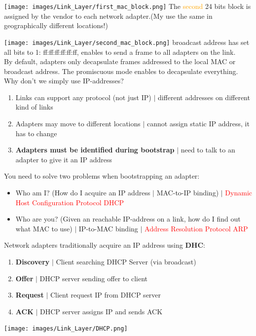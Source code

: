 \documentclass[a4paper, fontsize=8pt, landscape, DIV=1]{scrartcl}
\begin{document}
\begin{multicols*}{4}
		\texttt{[image: images/Link\_Layer/first\_mac\_block.png]}
		The \textcolor{Orange}{second} 24 bits block is assigned by the vendor to
		each network adapter.(My use the same in geographically different locations!)
		
		\texttt{[image: images/Link\_Layer/second\_mac\_block.png]}
		broadcast address has set all bits to 1: ff:ff:ff:ff:ff:ff, enables to
		send a frame to all adapters on the link.\\
		By default, adapters only decapsulate frames addressed to the local MAC or
		broadcast address. The promiscuous mode enables to decapsulate everything.\\
		Why don't we simply use IP-addresses?
		\begin{enumerate}[noitemsep]
			\item Links can support any protocol (not just IP) $\vert$ different
			addresses on different kind of links
			\item Adapters may move to different locations $\vert$ cannot assign
			static IP address, it has to change
			\item \textbf{Adapters must be identified during bootstrap} $\vert$ need
			to talk to an adapter to give it an IP address 
		\end{enumerate} 
		You need to solve two problems when bootstrapping an adapter:
		\begin{itemize}[noitemsep]
			\item Who am I? (How do I acquire an IP address $\vert$ MAC-to-IP
			binding) $\vert$ \textcolor{Red}{Dynamic Host Configuration Protocol DHCP}
			\item Who are you? (Given an reachable IP-address on a link, how do I
			find out what MAC to use) $\vert$ IP-to-MAC binding $\vert$
			\textcolor{Red}{Address Resolution Protocol ARP}
		\end{itemize}
		Network adapters traditionally acquire an IP address using \textbf{DHC}:
		\begin{enumerate}[noitemsep]
			\item \textbf{Discovery} $\vert$ Client searching DHCP Server (via
			broadcast)
			\item \textbf{Offer} $\vert$ DHCP server sending offer to client
			\item \textbf{Request} $\vert$ Client request IP from DHCP server
			\item \textbf{ACK} $\vert$ DHCP server assigns IP and sends ACK 
		\end{enumerate}
		\texttt{[image: images/Link\_Layer/DHCP.png]}
		\par 
		

\end{multicols*}
\end{document}
